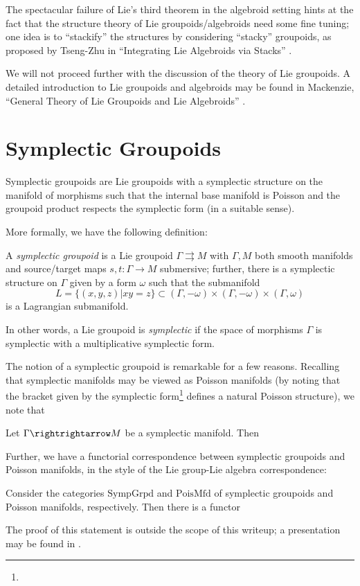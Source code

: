 The spectacular failure of Lie's third theorem in the algebroid setting hints at the fact that the structure theory of Lie groupoids/algebroids need some fine tuning; one idea is to ``stackify'' the structures by considering ``stacky'' groupoids, as proposed by Tseng-Zhu in ``Integrating Lie Algebroids via Stacks'' \cite{tsengzhu}.

We will not proceed further with the discussion of the theory of Lie groupoids. A detailed introduction to Lie groupoids and algebroids may be found in Mackenzie, ``General Theory of Lie Groupoids and Lie Algebroids'' \cite{mackenzie}.
\section{Symplectic Groupoids}
Symplectic groupoids are Lie groupoids with a symplectic structure on the manifold of morphisms such that the internal base manifold is Poisson and the groupoid product respects the symplectic form (in a suitable sense).

More formally, we have the following definition:
\begin{defn}
A \emph{symplectic groupoid} is a Lie groupoid $\Gamma \rightrightarrows M$ with $\Gamma, M$ both smooth manifolds and source/target maps $s,t: \Gamma \to M$ submersive; further, there is a symplectic structure on $\Gamma$ given by a form $\omega$ such that the submanifold
$$
L = \{(x,y,z) | xy = z \} \subset (\Gamma,-\omega) \times (\Gamma,-\omega) \times (\Gamma,\omega)
$$
is a Lagrangian submanifold.

In other words, a Lie groupoid is \emph{symplectic} if the space of morphisms $\Gamma$ is symplectic with a multiplicative symplectic form.
\end{defn} %

The notion of a symplectic groupoid is remarkable for a few reasons. Recalling that symplectic manifolds may be viewed as Poisson manifolds (by noting that the bracket given by the symplectic form\footnote{} defines a natural Poisson structure), we note that %
\begin{thrm}
Let $\Gamma \rightrightarrow M$ be a symplectic manifold. Then %
\end{thrm}

Further, we have a functorial correspondence between symplectic groupoids and Poisson manifolds, in the style of the Lie group-Lie algebra correspondence:
\begin{thrm}
Consider the categories $\mathrm{SympGrpd}$ and $\mathrm{PoisMfd}$ of symplectic groupoids and Poisson manifolds, respectively. Then there is a functor %
\end{thrm}
The proof of this statement is outside the scope of this writeup; a presentation may be found in \cite{SOMETHING HERE}. %


